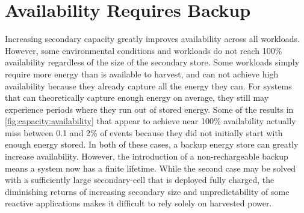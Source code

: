 \section{Availability Requires Backup}
\label{sec:capacity:primary}

Increasing secondary capacity greatly improves
availability across all workloads.
However, some environmental
conditions and workloads do not reach 100\% availability regardless of the size
of the secondary store.
Some workloads simply require more energy
than is available to harvest, and can not achieve high availability because they already capture all the energy they can.
For systems that can theoretically capture enough energy on average, they still may experience periods where they run out of stored energy.
Some of the results in \cref{fig:capacity:availability}
that appear to achieve near 100\% availability actually miss between 0.1 and 2\% of events because they did not initially start with enough energy stored.
In both of these cases, a backup energy store can greatly increase availability.
However, the introduction of a non-rechargeable backup means a system now has a finite lifetime.
While the second case may be solved with a sufficiently large secondary-cell that is deployed fully charged, the
diminishing returns of increasing secondary size and
unpredictability of some reactive applications
makes it difficult to rely solely on harvested power.


